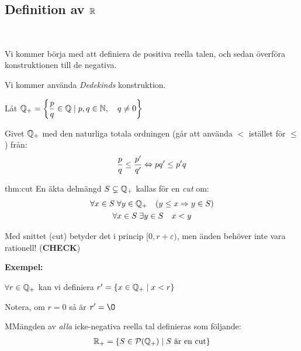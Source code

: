 \subsection{Definition av $\mathbb{R}$}\hfill\\\par
\noindent Vi kommer börja med att definiera de positiva reella talen, och sedan överföra konstruktionen till de negativa.
\par\bigskip
\noindent Vi kommer använda \textit{Dedekinds} konstruktion.
\par\bigskip
\noindent Låt $\mathbb{Q}_+ = \left\{\dfrac{p}{q}\in\mathbb{Q}\;|\;p,q\in\mathbb{N},\quad q\neq0\right\}$\par
\noindent Givet $\mathbb{Q}_+$ med den naturliga totala ordningen (går att använda $<$ istället för $\leq$) från:
\begin{equation*}
  \begin{gathered}
    \dfrac{p}{q}\leq \dfrac{p^{\prime}}{q^{\prime}}\Leftrightarrow pq^{\prime}\leq p^{\prime}q
  \end{gathered}
\end{equation*}
\par\bigskip
\begin{theo}[Cut]{thm:cut}
  En äkta delmängd $S\subsetneq \mathbb{Q}_+$ kallas för en \textit{cut} om:
  \begin{equation*}
    \begin{gathered}
      \forall x\in S\;\forall y\in \mathbb{Q}_+\quad (y\leq x\Rightarrow y\in S)\\
      \forall x\in S\;\exists y\in S\quad x<y
    \end{gathered}
  \end{equation*}
\end{theo}
\par\bigskip
\noindent Med snittet (cut) betyder det i princip $[0,r+\varepsilon)$, men änden behöver inte vara rationell! (\textbf{CHECK})
\par\bigskip
\noindent\textbf{Exempel:}\par
\noindent $\forall r\in\mathbb{Q}_+$ kan vi definiera $r^{\prime} = \left\{x\in\mathbb{Q}_+\;|\; x<r\right\}$\par
\noindent Notera, om $r =0$ så är $r^{\prime}=\O$
\par\bigskip
\begin{theo}
  MMängden av \textit{alla} icke-negativa reella tal definieras som följande:
  \begin{equation*}
    \begin{gathered}
      \mathbb{R}_+ = \left\{S\in\mathcal{P}(\mathbb{Q}_+)\;|\;S\text{ är en cut}\right\}
    \end{gathered}
  \end{equation*}
\end{theo}
